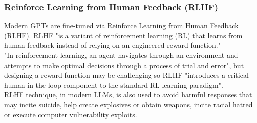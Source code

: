 \documentclass[12pt]{article}
\begin{document}

        \subsubsection{Reinforce Learning from Human Feedback (RLHF)}

Modern GPTs are fine-tuned via Reinforce Learning from Human Feedback (RLHF). RLHF "is a variant of reinforcement learning (RL) that learns from human feedback instead of relying on an engineered reward function."\cite{kaufmann2024surveyreinforcementlearninghuman}\\ "In reinforcement learning, an agent navigates through an environment and attempts to make optimal decisions through a process of trial and error"\cite{kaufmann2024surveyreinforcementlearninghuman}, but designing a reward function may be challenging so RLHF "introduces a critical human-in-the-loop component to the standard RL learning paradigm".\cite{kaufmann2024surveyreinforcementlearninghuman}\\ RLHF technique, in modern LLMs, is also used to avoid harmful responses that may incite suicide, help create explosives or obtain weapons, incite racial hatred or execute computer vulnerability exploits.
\end{document}
